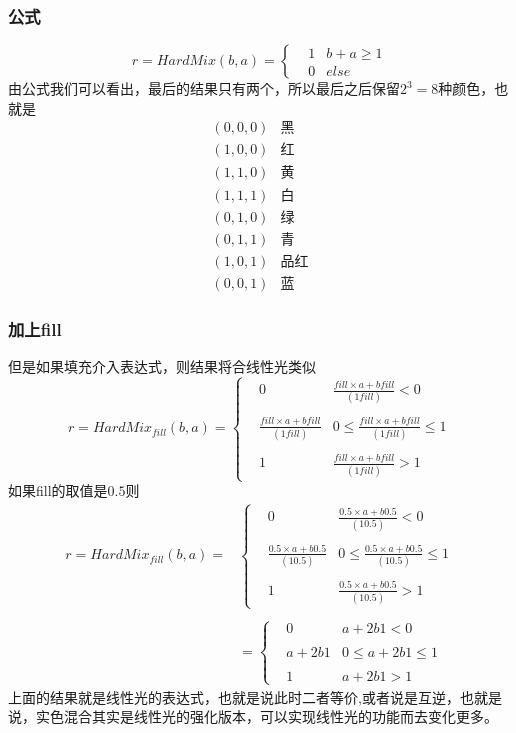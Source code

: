 \subsubsection{ 公式}
$$r=HardMix(b,a)=\left\{ \begin{aligned}&1&b+a\geq 1\\&0&else  \end{aligned}\right.$$
由公式我们可以看出，最后的结果只有两个，所以最后之后保留$2^3=8$种颜色，也就是
$$\begin{aligned}(0,0,0)&黑\\(1,0,0)&红\\(1,1,0)&黄\\(1,1,1)&白\\(0,1,0)&绿\\(0,1,1)&青\\(1,0,1)&品红\\(0,0,1)&蓝\end{aligned}$$
\subsubsection{ 加上fill}
但是如果填充介入表达式，则结果将合线性光类似
$$r=HardMix_{fill}(b,a)=\left\{ \begin{aligned}&0&  \frac{fill\times a+bfill}{(1fill)}<0\\ &\\ &\frac{fill\times a+bfill}{(1fill)}&0\leq \frac{fill\times a+bfill}{(1fill)}\leq 1\\&\\ &1&  \frac{fill\times a+bfill}{(1fill)}>1 \end{aligned}\right.$$
如果fill的取值是$0.5$则
$$\begin{aligned}r=HardMix_{fill}(b,a)=&\left\{ \begin{aligned}&0&  \frac{0.5\times a+b0.5}{(10.5)}<0\\ &\\ &\frac{0.5\times a+b0.5}{(10.5)}&0\leq \frac{0.5\times a+b0.5}{(10.5)}\leq 1\\ &\\&1&  \frac{0.5\times a+b0.5}{(10.5)}>1  \end{aligned}\right.\\&\\&=\left\{ \begin{aligned}&0&  a+2b1<0\\ &\\ &a+2b1&0\leq a+2b1\leq 1\\&\\ &1&  a+2b1>1    \end{aligned}\right.\end{aligned}$$
上面的结果就是线性光的表达式，也就是说此时二者等价,或者说是互逆，也就是说，实色混合其实是线性光的强化版本，可以实现线性光的功能而去变化更多。

